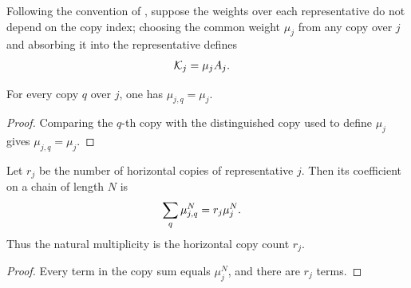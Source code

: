 \begin{definition}
    \label{def:mpdo_common_sector_weight_absorption}
    \leanok
    Following the convention of
    \cite[Appendix~C.2, equation~CFK, lines~1660--1665]
    {Cirac2016MPDO_arXiv}, suppose the weights over each representative do not
    depend on the copy index; choosing the common weight $\mu_j$ from any copy
    over $j$ and absorbing it into the representative defines
    \begin{align}
        \mathcal K_j & =\mu_j A_j.
        \notag
    \end{align}
\end{definition}

\begin{lemma}
    \label{lem:mpdo_copy_weight_eq_common_weight}
    \leanok
    For every copy $q$ over $j$, one has $\mu_{j,q}=\mu_j$.
\end{lemma}

\begin{proof}\leanok
    Comparing the $q$-th copy with the distinguished copy used to define
    $\mu_j$ gives $\mu_{j,q}=\mu_j$.
\end{proof}

\begin{lemma}
    \label{thm:mpdo_common_weight_coefficient}
    \leanok
    Let $r_j$ be the number of horizontal copies of representative $j$. Then
    its coefficient on a chain of length $N$ is
    \begin{align}
        \sum_q\mu_{j,q}^{N} & =r_j\mu_j^{N}.
        \notag
    \end{align}
    Thus the natural multiplicity is the horizontal copy count $r_j$.
\end{lemma}

\begin{proof}\leanok
    Every term in the copy sum equals $\mu_j^N$, and there are $r_j$ terms.
\end{proof}

